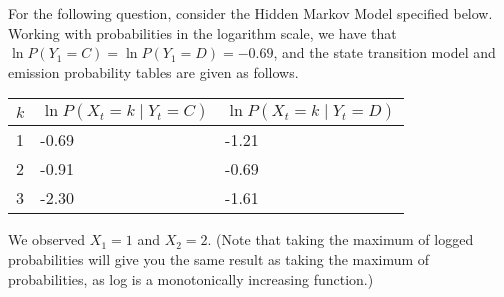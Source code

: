 \documentclass[11pt,addpoints,answers]{exam}
\begin{document}
\begin{questions}
\clearpage

For the following question, consider the Hidden Markov Model specified below. Working with probabilities in the logarithm scale, we have that $\ln{P(Y_1=C)} = \ln{P(Y_1=D)} = -0.69$, and the state transition model and emission probability tables are given as follows.

\begin{center}
\end{center}
\begin{table}[h!]
\centering
\begin{tabular}{|l|l|l|}
\hline
\multicolumn{1}{|c|}{$k$} & \multicolumn{1}{c|}{$\ln{P(X_t=k\mid Y_t=C)}$} & $\ln{P(X_t=k \mid Y_t=D)}$ \\ \hline
1                           & -0.69                           & -1.21      \\ \hline
2                           & -0.91                           & -0.69         \\ \hline
3                           & -2.30                           & -1.61      \\ \hline
\end{tabular}
\end{table}

 We observed $X_1 = 1$ and $X_2 = 2$. (Note that taking the maximum of logged probabilities will give you the same result as taking the maximum of probabilities, as log is a monotonically increasing function.)

    
\end{questions}
\end{document}
